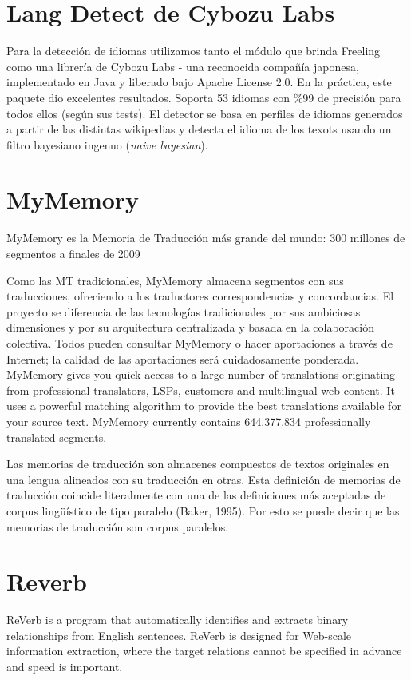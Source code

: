 \section{Lang Detect de Cybozu Labs}

Para la detecci\'on de idiomas utilizamos tanto el m\'odulo que brinda Freeling como una librer\'ia de Cybozu Labs - una reconocida compañ\'ia japonesa,
implementado en Java y liberado bajo Apache License 2.0. En la pr\'actica, este paquete dio excelentes resultados. Soporta 53 idiomas con \%99 de precisi\'on
para todos ellos (seg\'un sus tests). El detector se basa en perfiles de idiomas generados a partir de las distintas wikipedias y detecta el idioma de los texots
usando un filtro bayesiano ingenuo (\textit{naive bayesian}).

\section{MyMemory}
MyMemory es la Memoria de Traducción más grande del mundo: 300 millones de segmentos a finales de 2009

Como las MT tradicionales, MyMemory almacena segmentos con sus traducciones, ofreciendo a los traductores correspondencias y concordancias. El proyecto se diferencia de las tecnologías tradicionales por sus ambiciosas dimensiones y por su arquitectura centralizada y basada en la colaboración colectiva. Todos pueden consultar MyMemory o hacer aportaciones a través de Internet; la calidad de las aportaciones será cuidadosamente ponderada.
MyMemory gives you quick access to a large number of translations originating from professional translators, LSPs, customers and multilingual web content. It uses a powerful matching algorithm to provide the best translations available for your source text. MyMemory currently contains 644.377.834 professionally translated segments.

Las memorias de traducción son almacenes compuestos de textos originales en una lengua alineados con su traducción en otras. Esta definición de memorias de traducción coincide literalmente con una de las definiciones más aceptadas de corpus lingüístico de tipo paralelo (Baker, 1995). Por esto se puede decir que las memorias de traducción son corpus paralelos.


\section{Reverb}

ReVerb is a program that automatically identifies and extracts binary relationships from English sentences. ReVerb is designed for Web-scale information extraction, where the target relations cannot be specified in advance and speed is important.


